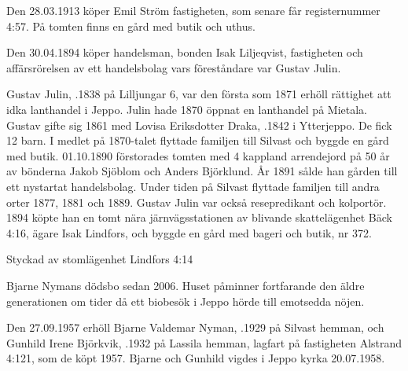 %
Den 28.03.1913 köper Emil Ström fastigheten, som senare får	registernummer 4:57. På tomten finns en gård med butik och uthus.\jhvspace{}


%
Den 30.04.1894 köper handelsman, bonden Isak Liljeqvist, fastigheten och affärsrörelsen av ett handelsbolag vars föreståndare var Gustav Julin.\jhvspace{}


%
Gustav Julin, .1838 på Lilljungar 6, var den första som	1871 erhöll rättighet att idka lanthandel i Jeppo. Julin hade 1870 öppnat en lanthandel på Mietala. Gustav gifte sig 1861 med Lovisa Eriksdotter Draka, .1842 i Ytterjeppo. De fick 12 barn. I medlet på 1870-talet flyttade familjen till Silvast och byggde en gård med butik. 01.10.1890 förstorades tomten med 4 kappland arrendejord på 50 år av bönderna Jakob Sjöblom och Anders Björklund. År 1891 sålde han gården till ett nystartat handelsbolag. Under tiden på Silvast flyttade familjen till andra orter 1877, 1881 och 1889. Gustav Julin var också resepredikant och kolportör. 1894 köpte han en tomt nära järnvägsstationen av blivande skattelägenhet Bäck 4:16, ägare Isak Lindfors, och byggde en gård med bageri och butik, nr 372.



%

Styckad av stomlägenhet Lindfors 4:14


%
Bjarne Nymans dödsbo sedan 2006. Huset påminner fortfarande den äldre generationen om tider då ett biobesök i Jeppo hörde till emotsedda nöjen.\jhvspace{}


%
Den 27.09.1957 erhöll Bjarne Valdemar Nyman, .1929 på Silvast hemman, och Gunhild Irene Björkvik, .1932 på Lassila hemman, lagfart på fastigheten Alstrand 4:121, som de köpt 1957. Bjarne och Gunhild vigdes i Jeppo kyrka 20.07.1958.


